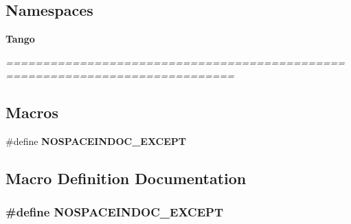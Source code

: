 \subsection*{Namespaces}
\begin{DoxyCompactItemize}
\item 
{\bf Tango}
\begin{DoxyCompactList}\small\item\em ============================================================================= \end{DoxyCompactList}\end{DoxyCompactItemize}
\subsection*{Macros}
\begin{DoxyCompactItemize}
\item 
\#define {\bf N\-O\-S\-P\-A\-C\-E\-I\-N\-D\-O\-C\-\_\-\-E\-X\-C\-E\-P\-T}
\end{DoxyCompactItemize}


\subsection{Macro Definition Documentation}
\subsubsection[{N\-O\-S\-P\-A\-C\-E\-I\-N\-D\-O\-C\-\_\-\-E\-X\-C\-E\-P\-T}]{\setlength{\rightskip}{0pt plus 5cm}\#define N\-O\-S\-P\-A\-C\-E\-I\-N\-D\-O\-C\-\_\-\-E\-X\-C\-E\-P\-T}\label{except_8h_a98061b263048c425ae02e64a6bbb0106}
